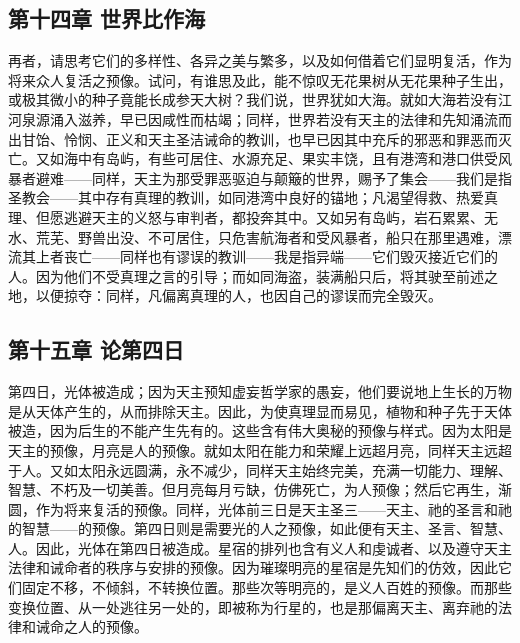 
\subsection{第十四章 世界比作海}

再者，请思考它们的多样性、各异之美与繁多，以及如何借着它们显明复活，作为将来众人复活之预像。试问，有谁思及此，能不惊叹无花果树从无花果种子生出，或极其微小的种子竟能长成参天大树？我们说，世界犹如大海。就如大海若没有江河泉源涌入滋养，早已因咸性而枯竭；同样，世界若没有天主的法律和先知涌流而出甘饴、怜悯、正义和天主圣洁诫命的教训，也早已因其中充斥的邪恶和罪恶而灭亡。又如海中有岛屿，有些可居住、水源充足、果实丰饶，且有港湾和港口供受风暴者避难——同样，天主为那受罪恶驱迫与颠簸的世界，赐予了集会——我们是指圣教会——其中存有真理的教训，如同港湾中良好的锚地；凡渴望得救、热爱真理、但愿逃避天主的义怒与审判者，都投奔其中。又如另有岛屿，岩石累累、无水、荒芜、野兽出没、不可居住，只危害航海者和受风暴者，船只在那里遇难，漂流其上者丧亡——同样也有谬误的教训——我是指异端——它们毁灭接近它们的人。因为他们不受真理之言的引导；而如同海盗，装满船只后，将其驶至前述之地，以便掠夺：同样，凡偏离真理的人，也因自己的谬误而完全毁灭。\par


\subsection{第十五章 论第四日}

第四日，光体被造成；因为天主预知虚妄哲学家的愚妄，他们要说地上生长的万物是从天体产生的，从而排除天主。因此，为使真理显而易见，植物和种子先于天体被造，因为后生的不能产生先有的。这些含有伟大奥秘的预像与样式。因为太阳是天主的预像，月亮是人的预像。就如太阳在能力和荣耀上远超月亮，同样天主远超于人。又如太阳永远圆满，永不减少，同样天主始终完美，充满一切能力、理解、智慧、不朽及一切美善。但月亮每月亏缺，仿佛死亡，为人预像；然后它再生，渐圆，作为将来复活的预像。同样，光体前三日是天主圣三——天主、祂的圣言和祂的智慧——的预像。第四日则是需要光的人之预像，如此便有天主、圣言、智慧、人。因此，光体在第四日被造成。星宿的排列也含有义人和虔诚者、以及遵守天主法律和诫命者的秩序与安排的预像。因为璀璨明亮的星宿是先知们的仿效，因此它们固定不移，不倾斜，不转换位置。那些次等明亮的，是义人百姓的预像。而那些变换位置、从一处逃往另一处的，即被称为行星的，也是那偏离天主、离弃祂的法律和诫命之人的预像。\par

